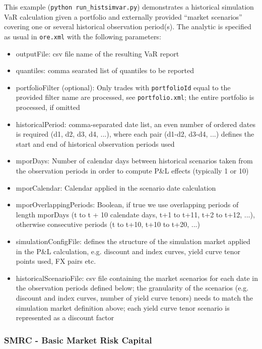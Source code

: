 This example ({\tt python run\_histsimvar.py}) demonstrates a historical simulation VaR calculation
given a portfolio and externally provided ``market scenarios'' covering
one or several historical observation period(s).
The analytic is specified as usual in {\tt ore.xml} with the following parameters:
\begin{itemize}
\item outputFile: csv file name of the resulting VaR report 
\item quantiles: comma searated list of quantiles to be reported
\item portfolioFilter (optional): Only trades with {\tt portfolioId} equal to the provided filter name are processed, see {\tt portfolio.xml}; the entire portfolio is processed, if omitted
\item historicalPeriod: comma-separated date list, an even number of ordered dates is required (d1, d2, d3, d4, ...), where each pair (d1-d2, d3-d4, ...) defines the start and end of historical observation periods used
\item mporDays: Number of calendar days between historical scenarios taken from the observation periods in order to compute P\&L effects (typically 1 or 10) 
\item mporCalendar: Calendar applied in the scenario date calculation
\item mporOverlappingPeriods: Boolean, if true we use overlapping periods of length mporDays (t to t + 10 calendate days, t+1 to t+11, t+2 to t+12, ...), otherwise consecutive periods (t to t+10, t+10 to t+20, ...)
\item simulationConfigFile: defines the structure of the simulation market applied in the P\&L calculation, e.g. discount and index curves, yield curve tenor points used, FX pairs etc.
\item historicalScenarioFile: csv file containing the market scenarios for each date in the observation periods defined below; the granularity of the scenarios (e.g. discount and index curves, number of yield curve tenors) needs to match the simulation market definition above; each yield curve tenor scenario is represented as a discount factor 
\end{itemize}

\subsubsection{SMRC - Basic Market Risk Capital}

